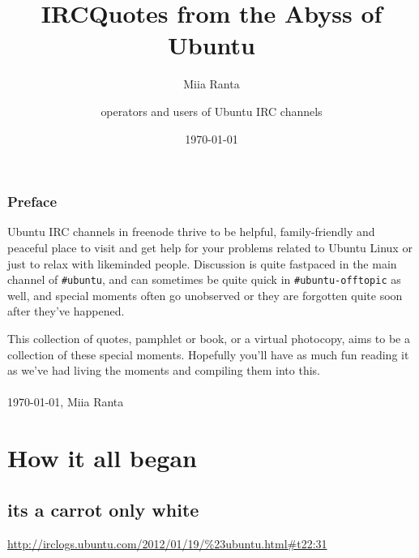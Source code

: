 \documentclass[a4paper]{book}
\title{IRCQuotes from the Abyss of Ubuntu}
\author{Miia Ranta \and operators and users of Ubuntu IRC channels}
\date{\today}
\begin{document}
\maketitle{}
\thispagestyle{empty}      %
\cleardoublepage{}		   %

\pagestyle{headings}	   %
\setcounter{page}{1}       %

\subsection*{Preface}      %

Ubuntu IRC channels in freenode thrive to be helpful, family-friendly 
and peaceful place to visit and get help for your problems related to 
Ubuntu Linux or just to relax with likeminded people. Discussion is quite 
fastpaced in the main channel of \verb$#ubuntu$, and can sometimes be quite 
quick in \verb$#ubuntu-offtopic$ as well, and special moments often go 
unobserved or they are forgotten quite soon after they've happened.

This collection of quotes, pamphlet or book, or a virtual photocopy, 
aims to be a collection of these special moments. Hopefully you'll 
have as much fun reading it as we've had living the moments and 
compiling them into this.
\\
\\
\today, Miia Ranta
\tableofcontents   %
\cleardoublepage{} %

\setcounter{page}{1}
\chapter{How it all began}

\section*{its a carrot only white}
\url{http://irclogs.ubuntu.com/2012/01/19/%23ubuntu.html#t22:31}
\end{document}

